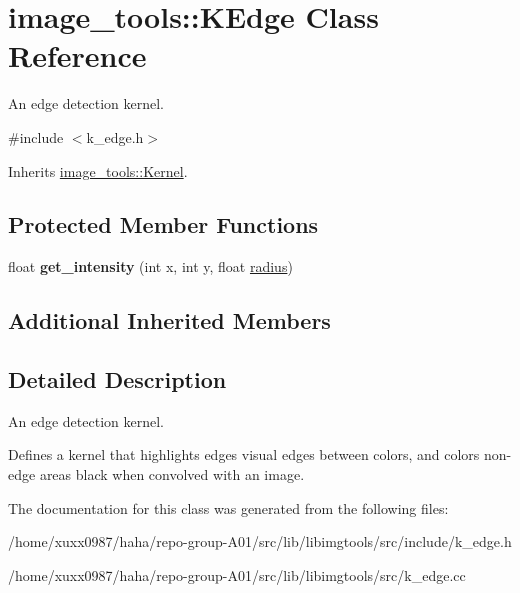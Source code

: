 \hypertarget{classimage__tools_1_1KEdge}{}\section{image\+\_\+tools\+:\+:K\+Edge Class Reference}
\label{classimage__tools_1_1KEdge}


An edge detection kernel.  




{\ttfamily \#include $<$k\+\_\+edge.\+h$>$}



Inherits \hyperlink{classimage__tools_1_1Kernel}{image\+\_\+tools\+::\+Kernel}.

\subsection*{Protected Member Functions}
\begin{DoxyCompactItemize}
\item 
float {\bfseries get\+\_\+intensity} (int x, int y, float \hyperlink{classimage__tools_1_1Kernel_ac834d16a242dd4a15f5f5e4a6dacea01}{radius})\hypertarget{classimage__tools_1_1KEdge_ac980938c27aeb2ea927fd7847dd5b020}{}\label{classimage__tools_1_1KEdge_ac980938c27aeb2ea927fd7847dd5b020}

\end{DoxyCompactItemize}
\subsection*{Additional Inherited Members}


\subsection{Detailed Description}
An edge detection kernel. 

Defines a kernel that highlights edges visual edges between colors, and colors non-\/edge areas black when convolved with an image. 

The documentation for this class was generated from the following files\+:\begin{DoxyCompactItemize}
\item 
/home/xuxx0987/haha/repo-\/group-\/\+A01/src/lib/libimgtools/src/include/k\+\_\+edge.\+h\item 
/home/xuxx0987/haha/repo-\/group-\/\+A01/src/lib/libimgtools/src/k\+\_\+edge.\+cc\end{DoxyCompactItemize}
